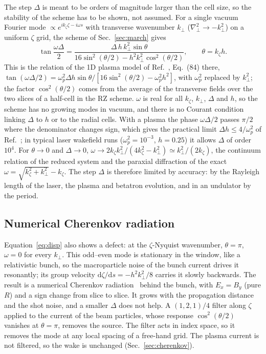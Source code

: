 \documentclass[aps,prab,reprint,floatfix,superscriptaddress,amsmath,amssymb]{revtex4-2}
\newcommand{\dd}{\mathrm{d}}
\begin{document}
The step $\Delta$ is meant to be orders of magnitude larger than the cell size, so the stability of the scheme has to be shown, not assumed. For a single vacuum Fourier mode $\propto e^{ik_\zeta\zeta - i\omega s}$ with transverse wavenumber $k_\perp$ ($\nabla_\perp^2 \to -k_\perp^2$) on a uniform $\zeta$ grid, the scheme of Sec.~\ref{sec:march} gives
\begin{equation}
\tan\frac{\omega\Delta}{2} = \frac{\Delta\, h\, k_\perp^2 \sin\theta}{16\sin^2(\theta/2) - h^2 k_\perp^2\cos^2(\theta/2)}, \qquad \theta = k_\zeta h. \label{eq:disp}
\end{equation}
This is the relation of the 1D plasma model of Ref.~\cite{GEMPIC}, Eq.~(84) there, $\tan(\omega\Delta/2) = \omega_p^2\Delta h\sin\theta/[16\sin^2(\theta/2) - \omega_p^2h^2]$, with $\omega_p^2$ replaced by $k_\perp^2$; the factor $\cos^2(\theta/2)$ comes from the average of the transverse fields over the two slices of a half-cell in the RZ scheme. $\omega$ is real for all $k_\zeta$, $k_\perp$, $\Delta$ and $h$, so the scheme has no growing modes in vacuum, and there is no Courant condition linking $\Delta$ to $h$ or to the radial cells. With a plasma the phase $\omega\Delta/2$ passes $\pi/2$ where the denominator changes sign, which gives the practical limit $\Delta h \le 4/\omega_p^2$ of Ref.~\cite{GEMPIC}; in typical laser wakefield runs ($\omega_p^2 = 10^{-3}$, $h = 0.25$) it allows $\Delta$ of order $10^4$. For $\theta \to 0$ and $\Delta \to 0$, $\omega \to 2k_\zeta k_\perp^2/(4k_\zeta^2 - k_\perp^2) \simeq k_\perp^2/(2k_\zeta)$, the continuum relation of the reduced system and the paraxial diffraction of the exact $\omega = \sqrt{k_\zeta^2 + k_\perp^2} - k_\zeta$. The step $\Delta$ is therefore limited by accuracy: by the Rayleigh length of the laser, the plasma and betatron evolution, and in an undulator by the period.

\subsection{Numerical Cherenkov radiation}\label{sec:cherenkovtheory}

Equation~\eqref{eq:disp} also shows a defect: at the $\zeta$-Nyquist wavenumber, $\theta = \pi$, $\omega = 0$ for every $k_\perp$. This odd--even mode is stationary in the window, like a relativistic bunch, so the macroparticle noise of the bunch current drives it resonantly; its group velocity $\dd\zeta/\dd s = -h^2k_\perp^2/8$ carries it slowly backwards. The result is a numerical Cherenkov radiation~\cite{Godfrey1974} behind the bunch, with $E_x = B_y$ (pure $R$) and a sign change from slice to slice. It grows with the propagation distance and the shot noise, and a smaller $\Delta$ does not help. A $(1,2,1)/4$ filter along $\zeta$ applied to the current of the beam particles, whose response $\cos^2(\theta/2)$ vanishes at $\theta = \pi$, removes the source. The filter acts in index space, so it removes the mode at any local spacing of a free-hand grid. The plasma current is not filtered, so the wake is unchanged (Sec.~\ref{sec:cherenkov}).
\end{document}

